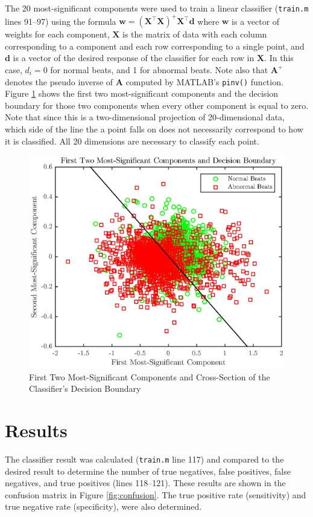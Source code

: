 \documentclass[12pt,letter]{article}
\begin{document}
The 20 most-significant components were used to train a linear classifier
(\verb`train.m` lines 91--97) using the formula $\mathbf{w} = (\mathbf{X}^\top
\mathbf{X})^+ \mathbf{X}^\top \mathbf{d}$ where $\mathbf{w}$ is a vector of
weights for each component, $\mathbf{X}$ is the matrix of data with each column
corresponding to a component and each row corresponding to a single point, and
$\mathbf{d}$ is a vector of the desired response of the classifier for each row
in $\mathbf{X}$.  In this case, $d_i = 0$ for normal beats, and 1 for abnormal
beats.  Note also that $\mathbf{A}^+$ denotes the pseudo inverse of $\mathbf{A}$
computed by MATLAB's \verb`pinv()` function.  Figure \ref{fig:classifier} shows
the first two most-significant components and the decision boundary for those
two components when every other component is equal to zero.  Note that since
this is a two-dimensional projection of 20-dimensional data, which side of the
line the a point falls on does not necessarily correspond to how it is
classified.  All 20 dimensions are necessary to classify each point.  

\begin{figure}[hbtp]
    \centering
    \includegraphics[height=0.42\textheight]{../figures/train_05}
    \caption{First Two Most-Significant Components and Cross-Section of the
    Classifier's Decision Boundary}
    \label{fig:classifier}
\end{figure}

\section{Results} 
The classifier result was calculated (\verb`train.m` line 117) and compared to
the desired result to determine the number of true negatives, false positives,
false negatives, and true positives (lines 118--121).  These results are shown
in the confusion matrix in Figure \ref{fig:confusion}. The true positive rate
(sensitivity) and true negative rate (specificity), were also determined.  
\end{document}
